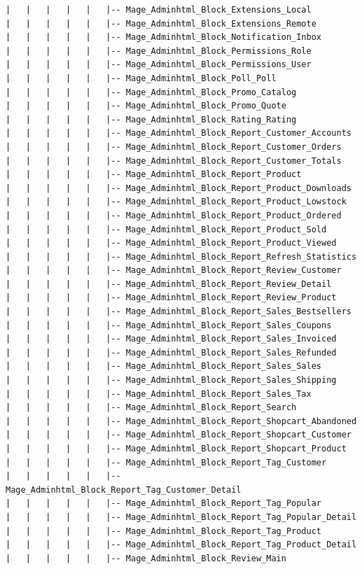 \documentclass[oneside]{book}
\begin{document}
\begin{lstlisting}
|   |   |   |   |   |-- Mage_Adminhtml_Block_Extensions_Local
|   |   |   |   |   |-- Mage_Adminhtml_Block_Extensions_Remote
|   |   |   |   |   |-- Mage_Adminhtml_Block_Notification_Inbox
|   |   |   |   |   |-- Mage_Adminhtml_Block_Permissions_Role
|   |   |   |   |   |-- Mage_Adminhtml_Block_Permissions_User
|   |   |   |   |   |-- Mage_Adminhtml_Block_Poll_Poll
|   |   |   |   |   |-- Mage_Adminhtml_Block_Promo_Catalog
|   |   |   |   |   |-- Mage_Adminhtml_Block_Promo_Quote
|   |   |   |   |   |-- Mage_Adminhtml_Block_Rating_Rating
|   |   |   |   |   |-- Mage_Adminhtml_Block_Report_Customer_Accounts
|   |   |   |   |   |-- Mage_Adminhtml_Block_Report_Customer_Orders
|   |   |   |   |   |-- Mage_Adminhtml_Block_Report_Customer_Totals
|   |   |   |   |   |-- Mage_Adminhtml_Block_Report_Product
|   |   |   |   |   |-- Mage_Adminhtml_Block_Report_Product_Downloads
|   |   |   |   |   |-- Mage_Adminhtml_Block_Report_Product_Lowstock
|   |   |   |   |   |-- Mage_Adminhtml_Block_Report_Product_Ordered
|   |   |   |   |   |-- Mage_Adminhtml_Block_Report_Product_Sold
|   |   |   |   |   |-- Mage_Adminhtml_Block_Report_Product_Viewed
|   |   |   |   |   |-- Mage_Adminhtml_Block_Report_Refresh_Statistics
|   |   |   |   |   |-- Mage_Adminhtml_Block_Report_Review_Customer
|   |   |   |   |   |-- Mage_Adminhtml_Block_Report_Review_Detail
|   |   |   |   |   |-- Mage_Adminhtml_Block_Report_Review_Product
|   |   |   |   |   |-- Mage_Adminhtml_Block_Report_Sales_Bestsellers
|   |   |   |   |   |-- Mage_Adminhtml_Block_Report_Sales_Coupons
|   |   |   |   |   |-- Mage_Adminhtml_Block_Report_Sales_Invoiced
|   |   |   |   |   |-- Mage_Adminhtml_Block_Report_Sales_Refunded
|   |   |   |   |   |-- Mage_Adminhtml_Block_Report_Sales_Sales
|   |   |   |   |   |-- Mage_Adminhtml_Block_Report_Sales_Shipping
|   |   |   |   |   |-- Mage_Adminhtml_Block_Report_Sales_Tax
|   |   |   |   |   |-- Mage_Adminhtml_Block_Report_Search
|   |   |   |   |   |-- Mage_Adminhtml_Block_Report_Shopcart_Abandoned
|   |   |   |   |   |-- Mage_Adminhtml_Block_Report_Shopcart_Customer
|   |   |   |   |   |-- Mage_Adminhtml_Block_Report_Shopcart_Product
|   |   |   |   |   |-- Mage_Adminhtml_Block_Report_Tag_Customer
|   |   |   |   |   |-- Mage_Adminhtml_Block_Report_Tag_Customer_Detail
|   |   |   |   |   |-- Mage_Adminhtml_Block_Report_Tag_Popular
|   |   |   |   |   |-- Mage_Adminhtml_Block_Report_Tag_Popular_Detail
|   |   |   |   |   |-- Mage_Adminhtml_Block_Report_Tag_Product
|   |   |   |   |   |-- Mage_Adminhtml_Block_Report_Tag_Product_Detail
|   |   |   |   |   |-- Mage_Adminhtml_Block_Review_Main

\end{lstlisting}
\end{document}

